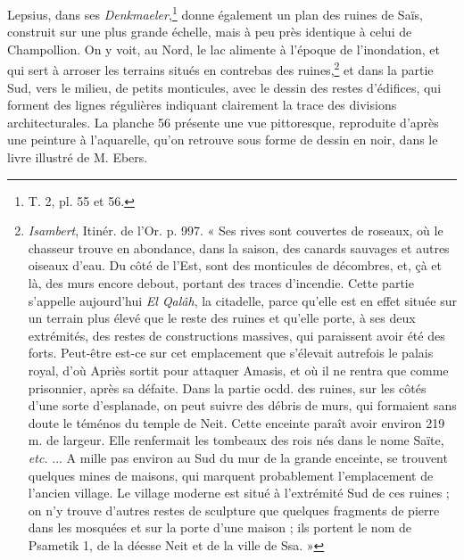 \documentclass[a4paper, 11pt, oneside]{article}
\begin{document}
Lepsius, dans ses \emph{Denkmaeler},\footnote{T. 2, pl. 55 et 56.} donne également un plan des ruines de Saïs, construit sur une plus grande échelle, mais à peu près identique à celui de Champollion. On y voit, au Nord, le lac alimente à l'époque de l'inondation, et qui sert à arroser les terrains situés en contrebas des ruines,\footnote{\emph{Isambert}, Itinér. de l'Or. p. 997. « Ses rives sont couvertes de roseaux, où le chasseur trouve en abondance, dans la saison, des canards sauvages et autres oiseaux d'eau. Du côté de l'Est, sont des monticules de décombres, et, çà et là, des murs encore debout, portant des traces d'incendie. Cette partie s'appelle aujourd'hui \emph{El Qalâh}, la citadelle, parce qu’elle est en effet située sur un terrain plus élevé que le reste des ruines et qu'elle porte, à ses deux extrémités, des restes de constructions massives, qui paraissent avoir été des forts. Peut-être est-ce sur cet emplacement que s'élevait autrefois le palais royal, d'où Apriès sortit pour attaquer Amasis, et où il ne rentra que comme prisonnier, après sa défaite. Dans la partie ocdd. des ruines, sur les côtés d'une sorte d'esplanade, on peut suivre des débris de murs, qui formaient sans doute le téménos du temple de Neit. Cette enceinte paraît avoir environ 219 m. de largeur. Elle renfermait les tombeaux des rois nés dans le nome Saïte, \emph{etc.} ... A mille pas environ au Sud du mur de la grande enceinte, se trouvent quelques mines de maisons, qui marquent probablement l'emplacement de l'ancien village. Le village moderne est situé à l'extrémité Sud de ces ruines ; on n'y trouve d'autres restes de sculpture que quelques fragments de pierre dans les mosquées et sur la porte d'une maison ; ils portent le nom de Psametik 1, de la déesse Neit et de la ville de Ssa. »} et dans la partie Sud, vers le milieu, de petits monticules, avec le dessin des restes d'édifices, qui forment des lignes régulières indiquant clairement la trace des divisions architecturales. La planche 56 présente une vue pittoresque, reproduite d'après une peinture à l'aquarelle, qu'on retrouve sous forme de dessin en noir, dans le livre illustré de M. Ebers.
\end{document}
